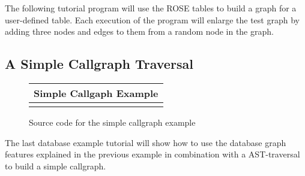 The following tutorial program will use the ROSE tables to build a graph for
a user-defined table. Each execution of the program will enlarge the test
graph by adding three nodes and edges to them from a random node in the graph.

\subsection{A Simple Callgraph Traversal}
\label{sec:TutDB:SimpleCG}

\begin{latexonly} 
\begin{figure}[tb] 
\begin{center} 
\begin{tabular}{|c|} \hline
     Simple Callgaph Example
\\\hline\hline

\\\hline
\end{tabular} \end{center}
\caption{ \label{fig:TutDB:SimpleCallgraph} Source code for the simple callgraph example }
\end{figure}
\end{latexonly}

The last database example tutorial will show how to use the database graph features
explained in the previous example in combination with a AST-traversal to
build a simple callgraph.  










